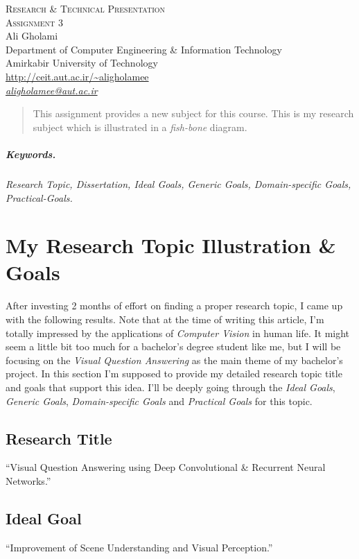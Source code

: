 \documentclass[12pt]{article}
\numberwithin{equation}{section}
\numberwithin{table}{section}
\numberwithin{figure}{section}
\begin{document}

\begin{center}
\textsc{\Large Research \& Technical Presentation} \\[2pt]
	\textsc{\large Assignment 3}\\
	\vspace{0.5cm}
  Ali Gholami \\[6pt]
  Department of Computer Engineering \& Information Technology\\
  Amirkabir University of Technology  \\[6pt]
  \def\UrlFont{\em}
  \url{http://ceit.aut.ac.ir/~aligholamee}\\
    \href{mailto:aligholamee@aut.ac.ir}{\textit{aligholamee@aut.ac.ir}}
\end{center}

\begin{abstract}
This assignment provides a new subject for this course. This is my research subject which is illustrated in a \textit{fish-bone} diagram.
\end{abstract}

\subparagraph{Keywords.} \textit{Research Topic, Dissertation, Ideal Goals, Generic Goals, Domain-specific Goals, Practical-Goals.}
\section{My Research Topic Illustration \& Goals}
After investing 2 months of effort on finding a proper research topic, I came up with the following results. Note that at the time of writing this article, I'm totally impressed by the applications of \textit{Computer Vision} in human life. It might seem a little bit too much for a bachelor's degree student like me, but I will be focusing on the \textit{Visual Question Answering} as the main theme of my bachelor's project. In this section I'm supposed to provide my detailed research topic title and goals that support this idea. I'll be deeply going through the \textit{Ideal Goals}, \textit{Generic Goals}, \textit{Domain-specific Goals} and \textit{Practical Goals} for this topic. 
\subsection*{Research Title}
``Visual Question Answering using Deep Convolutional \& Recurrent Neural Networks.''

\subsection*{Ideal Goal}
``Improvement of Scene Understanding and Visual Perception.''
\end{document}
